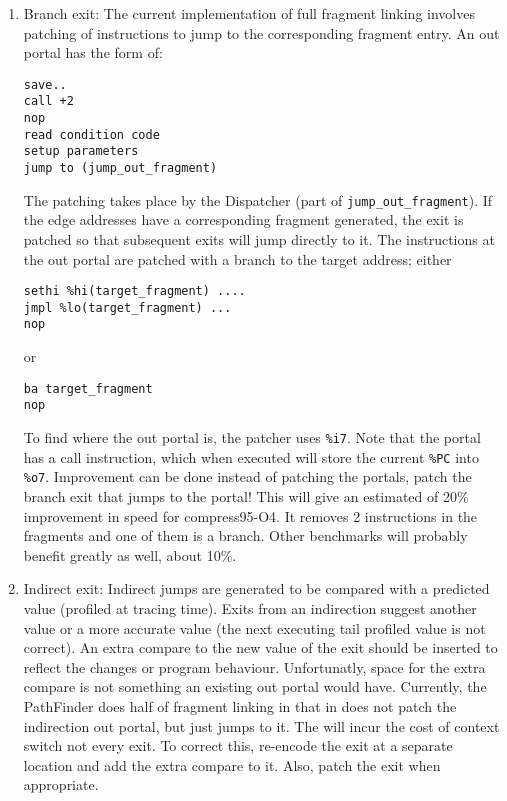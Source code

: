 \begin{enumerate}
\item Branch exit: 
The current implementation of full fragment linking involves patching of
instructions to jump to the corresponding fragment entry.
An out portal has the form of:
\begin{verbatim}
save..
call +2
nop
read condition code
setup parameters
jump to (jump_out_fragment)
\end{verbatim}

The patching takes place by the Dispatcher (part of 
\texttt{jump\_out\_fragment}).
If the edge addresses have a corresponding fragment generated, the exit is
patched so that subsequent exits will jump directly to it.
The instructions at the out portal are patched with a branch to the 
target address; either 

\begin{verbatim}
sethi %hi(target_fragment) ....
jmpl %lo(target_fragment) ...
nop
\end{verbatim}

or 

\begin{verbatim}
ba target_fragment
nop
\end{verbatim}

To find where the out portal is, the patcher uses \texttt{\%i7}.  
Note that the portal has a call instruction, which when executed will store the
current \texttt{\%PC} into \texttt{\%o7}.
Improvement can be done instead of patching the portals, patch the branch exit
that jumps to the portal!
This will give an estimated of 20\% improvement in speed for compress95-O4.
It removes 2 instructions in the fragments and one of them is a branch.
Other benchmarks will probably benefit greatly as well, about 10\%.

\item Indirect exit: 
Indirect jumps are generated to be compared with a predicted value (profiled 
at tracing time).  
Exits from an indirection suggest another value or a more accurate value 
(the next executing tail profiled value is not correct).
An extra compare to the new value of the exit should be inserted to reflect the
changes or program behaviour.
Unfortunatly, space for the extra compare is not something an existing out
portal would have.
Currently, the PathFinder does half of fragment linking in that in does not 
patch the indirection out portal, but just jumps to it.  
The will incur the cost of context switch not every exit.
To correct this, re-encode the exit at a separate location and add the extra
compare to it.  Also, patch the exit when appropriate.
\end{enumerate}



